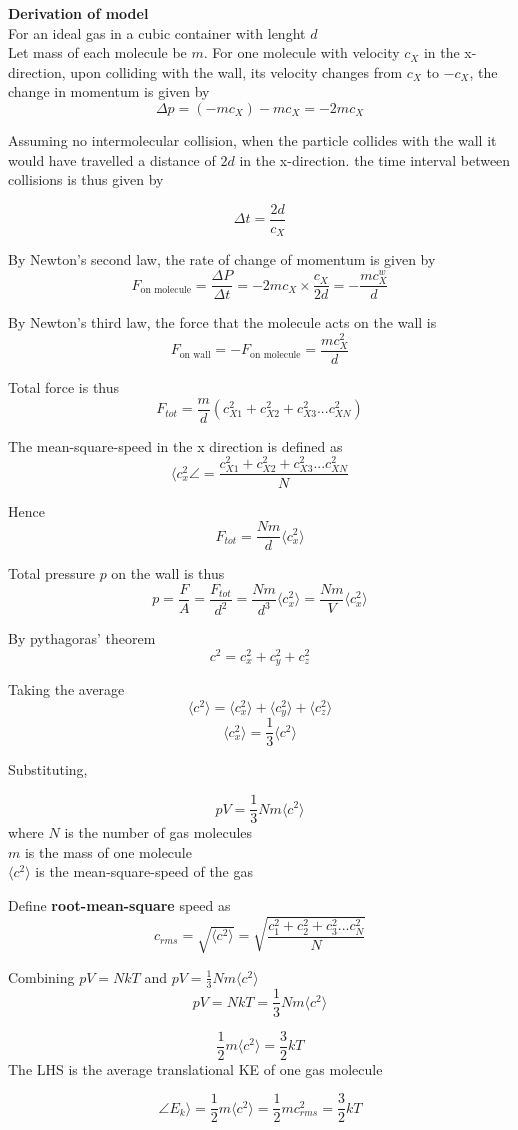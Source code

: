 \documentclass[a4paper, 10pt]{article}
\begin{document}
\textbf{Derivation of model} \\

For an ideal gas in a cubic container with lenght $d$  \\
Let mass of each molecule be $m$. For one molecule with velocity $c_X$ in the x-direction, upon colliding with the wall, its velocity changes from $c_X$ to $-c_X$, the change in momentum is given by
\[
   \Delta p = (-mc_X) - mc_X = -2 mc_X
\]

Assuming no intermolecular collision, when the particle collides with the wall it would have travelled a distance of $2d$ in the x-direction. the time interval between collisions is thus given by

\[
\Delta t = \frac{2d}{c_X}
\]

By Newton's second law, the rate of change of momentum is given by
\[
   F_{\text{on molecule}} = \frac{\Delta P}{\Delta t} = -2mc_X \times \frac{c_X}{2d} = -\frac{mc_X^w}{d}
\]

By Newton's third law, the force that the molecule acts on the wall is 
\[
   F_{\text{on wall}} = - F_{\text{on molecule}} = \frac{mc_X^2}{d}
\]

Total force is thus
\[
   F_{tot} = \frac{m}{d}(c_{X1}^2 + c_{X2}^2 + c_{X3}^2 ... c_{XN}^2)
\]

The mean-square-speed in the x direction is defined as 
\[
\langle c_x^2 \angle = \frac{c_{X1}^2 + c_{X2}^2 + c_{X3}^2 ... c_{XN}^2}{N}
\]

Hence 
\[
   F_{tot} = \frac{Nm}{d} \langle c_x^2 \rangle
\]

Total pressure $p$ on the wall is thus
\[
   p = \frac{F}{A} = \frac{F_{tot}}{d^2} = \frac{Nm}{d^3} \langle c_x^2 \rangle = \frac{Nm}{V}\langle c_x^2 \rangle 
\]

By pythagoras' theorem
\[
c^2 = c_x^2 + c_y^2 + c_z^2
\]

Taking the average
\[
\langle c^2 \rangle = \langle c_x^2 \rangle + \langle c_y^2 \rangle + \langle c_z^2 \rangle
\]
\[
\langle c_x^2 \rangle = \frac{1}{3} \langle c^2 \rangle
\]

Substituting, 
\begin{framed}
\[
pV = \frac{1}{3} Nm \langle c^2 \rangle
\]
where $N$ is the number of gas molecules \\
$m$ is the mass of one molecule \\
$\langle c^2 \rangle$ is the mean-square-speed of the gas
\end{framed}	

Define \textbf{root-mean-square} speed as 
\[
   c_{rms} = \sqrt{\langle c^2 \rangle} = \sqrt{\frac{c_1^2 + c_2^2 + c_3^2 ... c_N^2}{N}}
\]


Combining $pV = NkT$  and $pV = \frac{1}{3}Nm\langle c^2 \rangle$ 
\[
pV = NkT = \frac{1}{3}Nm \langle c^2 \rangle
\]

\[
\frac{1}{2}m \langle c^2 \rangle = \frac{3}{2} kT
\]
The LHS is the average translational KE of one gas molecule 
\begin{framed}
   \[
      \angle E_k \rangle = \frac{1}{2}m \langle c^2 \rangle = \frac{1}{2}mc_{rms}^2 = \frac{3}{2}kT
   \]
   
\end{framed}	
\end{document}
